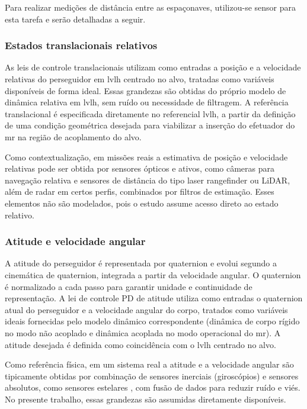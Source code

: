 Para realizar medições de distância entre as espaçonaves, utilizou-se sensor para esta tarefa e serão detalhadas a seguir.

\subsubsection{Estados translacionais relativos}
\label{subsubsec:sensoriamento_translacional}

As leis de controle translacionais utilizam como entradas a posição e a velocidade relativas do perseguidor em \gls{lvlh} centrado no alvo, tratadas como variáveis disponíveis de forma ideal.
Essas grandezas são obtidas do próprio modelo de dinâmica relativa em \gls{lvlh}, sem ruído ou necessidade de filtragem.
A referência translacional é especificada diretamente no referencial \gls{lvlh}, a partir da definição de uma condição geométrica desejada para viabilizar a inserção do efetuador do \gls{mr} na região de acoplamento do alvo.

Como contextualização, em missões reais a estimativa de posição e velocidade relativas pode ser obtida por sensores ópticos e ativos, como câmeras para navegação relativa e sensores de distância do tipo laser \cite{wertz2011sme_smad} rangefinder ou LiDAR, além de radar em certos perfis, combinados por filtros de estimação.
Esses elementos não são modelados, pois o estudo assume acesso direto ao estado relativo.

\subsubsection{Atitude e velocidade angular}
\label{subsubsec:sensoriamento_atitude}

A atitude do perseguidor é representada por quaternion e evolui segundo a cinemática de quaternion, integrada a partir da velocidade angular.
O quaternion é normalizado a cada passo para garantir unidade e continuidade de representação.
A lei de controle PD de atitude utiliza como entradas o quaternion atual do perseguidor e a velocidade angular do corpo, tratados como variáveis ideais fornecidas pelo modelo dinâmico correspondente (dinâmica de corpo rígido no modo não acoplado e dinâmica acoplada no modo operacional do \gls{mr}).
A atitude desejada é definida como coincidência com o \gls{lvlh} centrado no alvo.

Como referência física, em um sistema real a atitude e a velocidade angular são tipicamente obtidas por combinação de sensores inerciais (giroscópios) e sensores absolutos, como sensores estelares \cite{wertz2011sme_smad}, com fusão de dados para reduzir ruído e viés. No presente trabalho, essas grandezas são assumidas diretamente disponíveis.

